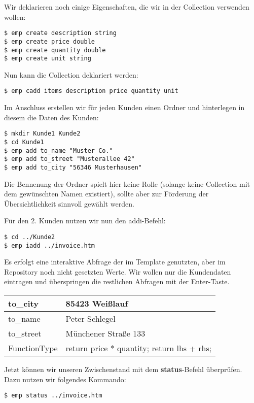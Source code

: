Wir deklarieren noch einige Eigenschaften, die wir in der Collection verwenden wollen:

\begin{lstlisting}[style=Bash]
$ emp create description string
$ emp create price double
$ emp create quantity double
$ emp create unit string
\end{lstlisting}

Nun kann die Collection deklariert werden:

\begin{lstlisting}[style=Bash]
$ emp cadd items description price quantity unit
\end{lstlisting}

Im Anschluss erstellen wir für jeden Kunden einen Ordner und hinterlegen in diesem die Daten des Kunden:
\begin{lstlisting}[style=Bash]
$ mkdir Kunde1 Kunde2
$ cd Kunde1
$ emp add to_name "Muster Co."
$ emp add to_street "Musterallee 42"
$ emp add to_city "56346 Musterhausen"
\end{lstlisting}

Die Bennenung der Ordner spielt hier keine Rolle (solange keine Collection mit dem gewünschten Namen existiert), sollte aber zur Förderung der Übersichtlichkeit sinnvoll gewählt werden.

Für den 2. Kunden nutzen wir nun den addi-Befehl:
\begin{lstlisting}[style=Bash]
$ cd ../Kunde2
$ emp iadd ../invoice.htm
\end{lstlisting}

Es erfolgt eine interaktive Abfrage der im Template genutzten, aber im Repository noch nicht gesetzten Werte. Wir wollen nur die Kundendaten eintragen und überspringen die restlichen Abfragen mit der Enter-Taste.

\begin{tabular}{| l | l |}
	\hline
	to\_city & 85423 Weißlauf \\
	\hline
	to\_name & Peter Schlegel \\
	\hline
	to\_street & Münchener Straße 133 \\
	\hline
	FunctionType & \grqq return price * quantity; return lhs + rhs; \grqq\\
	\hline
\end{tabular}

Jetzt können wir unseren Zwischenstand mit dem \textbf{status}-Befehl überprüfen. Dazu nutzen wir folgendes Kommando:
\begin{lstlisting}[style=Bash]
$ emp status ../invoice.htm
\end{lstlisting}

